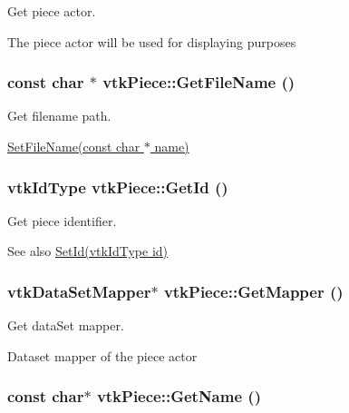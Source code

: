 Get piece actor. 

The piece actor will be used for displaying purposes \hypertarget{classvtkPiece_a1a91d9507576694b80da93c1ce7c3861}{
\subsubsection[{GetFileName}]{\setlength{\rightskip}{0pt plus 5cm}const char $\ast$ vtkPiece::GetFileName ()}}
\label{classvtkPiece_a1a91d9507576694b80da93c1ce7c3861}


Get filename path. 

\hyperlink{classvtkPiece_a6bd1ffdbd75747966f41c7dfee8f8b4d}{SetFileName(const char $\ast$ name)} \hypertarget{classvtkPiece_a2c1faf03ee84364ed939a330d58ab2a6}{
\subsubsection[{GetId}]{\setlength{\rightskip}{0pt plus 5cm}vtkIdType vtkPiece::GetId ()}}
\label{classvtkPiece_a2c1faf03ee84364ed939a330d58ab2a6}


Get piece identifier. 

\begin{DoxySeeAlso}{See also}
\hyperlink{classvtkPiece_a077a58755fe796f485c25e3ecda1e994}{SetId(vtkIdType id)} 
\end{DoxySeeAlso}
\hypertarget{classvtkPiece_aca0100088140d579b1391f7ad5a557ec}{
\subsubsection[{GetMapper}]{\setlength{\rightskip}{0pt plus 5cm}vtkDataSetMapper$\ast$ vtkPiece::GetMapper ()}}
\label{classvtkPiece_aca0100088140d579b1391f7ad5a557ec}


Get dataSet mapper. 

Dataset mapper of the piece actor \hypertarget{classvtkPiece_aaaf5a6463ed77fff3a6ece4612db0e13}{
\subsubsection[{GetName}]{\setlength{\rightskip}{0pt plus 5cm}const char$\ast$ vtkPiece::GetName ()}}
\label{classvtkPiece_aaaf5a6463ed77fff3a6ece4612db0e13}


